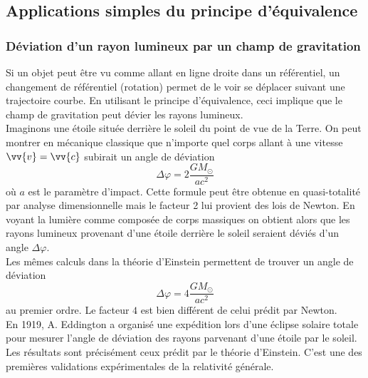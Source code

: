 \documentclass[a4paper,11pt]{report}
\theoremstyle{definition}
\theoremstyle{plain}
\theoremstyle{definition}
\theoremstyle{remark}
\begin{document}
        \subsection{Applications simples du principe d'équivalence}
        
            \subsubsection{Déviation d'un rayon lumineux par un champ de gravitation}
            
                Si un objet peut être vu comme allant en ligne droite dans un référentiel, un changement de référentiel (rotation) permet de le voir se déplacer suivant une trajectoire courbe. En utilisant le principe d'équivalence, ceci implique que le champ de gravitation peut dévier les rayons lumineux.\\
                
                Imaginons une étoile située derrière le soleil du point de vue de la Terre. On peut montrer en mécanique classique que n'importe quel corps allant à une vitesse $\vv{v} = \vv{c}$ subirait un angle de déviation
                \begin{equation}
                    \Delta\varphi = 2\frac{GM_\odot}{ac^2}
                \end{equation}
                où $a$ est le paramètre d'impact. Cette formule peut être obtenue en quasi-totalité par analyse dimensionnelle mais le facteur 2 lui provient des lois de Newton. En voyant la lumière comme composée de corps massiques on obtient alors que les rayons lumineux provenant d'une étoile derrière le soleil seraient déviés d'un angle $\Delta\varphi$.\\
                
                Les mêmes calculs dans la théorie d'Einstein permettent de trouver un angle de déviation
                \begin{equation}
                    \Delta\varphi = 4\frac{GM_\odot}{ac^2}
                \end{equation}
                au premier ordre. Le facteur $4$ est bien différent de celui prédit par Newton.\\
                
                En 1919, A. Eddington a organisé une expédition lors d'une éclipse solaire totale pour mesurer l'angle de déviation des rayons parvenant d'une étoile par le soleil. Les résultats sont précisément ceux prédit par le théorie d'Einstein. C'est une des premières validations expérimentales de la relativité générale.
            
\end{document}
